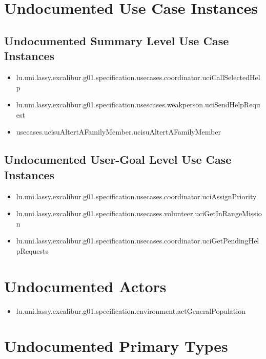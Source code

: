 \section[Undocumented Use Case Instances]{Undocumented Use Case Instances}

\subsection[Undocumented Use Case Instances - Summary Level]{Undocumented Summary Level Use Case Instances}
\begin{itemize}
\item lu.uni.lassy.excalibur.g01.specification.usecases.coordinator.uciCallSelectedHelp 
\item lu.uni.lassy.excalibur.g01.specification.usescases.weakperson.uciSendHelpRequest 
\item usecases.ucisuAltertAFamilyMember.ucisuAltertAFamilyMember 
\end{itemize}

\subsection[Undocumented Use Case Instances - User-Goal Level]{Undocumented User-Goal Level Use Case Instances}
\begin{itemize}
\item lu.uni.lassy.excalibur.g01.specification.usecases.coordinator.uciAssignPriority 
\item lu.uni.lassy.excalibur.g01.specification.usecases.volunteer.uciGetInRangeMission 
\item lu.uni.lassy.excalibur.g01.specification.usecases.coordinator.uciGetPendingHelpRequests 
\end{itemize}




\section[Undocumented Actors]{Undocumented Actors}
\begin{itemize}
\item lu.uni.lassy.excalibur.g01.specification.environment.actGeneralPopulation 
\end{itemize}




\section[Undocumented Primary Types]{Undocumented Primary Types}


